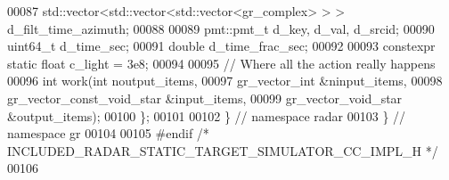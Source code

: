 \begin{DoxyCode}
00087       std::vector<std::vector<std::vector<gr\_complex> > > d_filt_time_azimuth;
00088 
00089       pmt::pmt\_t d_key, d_val, d_srcid;
00090       uint64\_t d_time_sec;
00091       \textcolor{keywordtype}{double} d_time_frac_sec;
00092 
00093       constexpr \textcolor{keyword}{static} \textcolor{keywordtype}{float} c_light = 3e8;
00094 
00095       \textcolor{comment}{// Where all the action really happens}
00096       \textcolor{keywordtype}{int} work(\textcolor{keywordtype}{int} noutput\_items,
00097               gr\_vector\_int &ninput\_items,
00098               gr\_vector\_const\_void\_star &input\_items,
00099               gr\_vector\_void\_star &output\_items);
00100     \};
00101 
00102   \} \textcolor{comment}{// namespace radar}
00103 \} \textcolor{comment}{// namespace gr}
00104 
00105 \textcolor{preprocessor}{#endif }\textcolor{comment}{/* INCLUDED\_RADAR\_STATIC\_TARGET\_SIMULATOR\_CC\_IMPL\_H */}\textcolor{preprocessor}{}
00106 
\end{DoxyCode}
